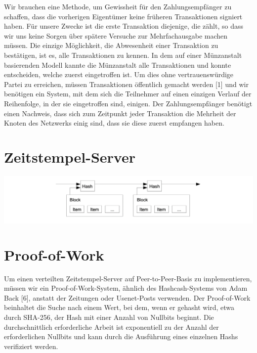\documentclass[10pt]{article}
\begin{document}
	Wir brauchen eine Methode, um Gewissheit für den Zahlungsempfänger zu schaffen, dass die vorherigen Eigentümer keine früheren Transaktionen signiert haben. Für unsere Zwecke ist die erste Transaktion diejenige, die zählt, so dass wir uns keine Sorgen über spätere Versuche zur Mehrfachausgabe machen müssen. Die einzige Möglichkeit, die Abwesenheit einer Transaktion zu bestätigen, ist es, alle Transaktionen zu kennen. In dem auf einer Münzanstalt basierenden Modell kannte die Münzanstalt alle Transaktionen und konnte entscheiden, welche zuerst eingetroffen ist. Um dies ohne vertrauenswürdige Partei zu erreichen, müssen Transaktionen öffentlich gemacht werden [1] und wir benötigen ein System, mit dem sich die Teilnehmer auf einen einzigen Verlauf der Reihenfolge, in der sie eingetroffen sind, einigen. Der Zahlungsempfänger benötigt einen Nachweis, dass sich zum Zeitpunkt jeder Transaktion die Mehrheit der Knoten des Netzwerks einig sind, dass sie diese zuerst empfangen haben.

	\section{Zeitstempel-Server}
	
	\begin{center}
		\includegraphics[scale=0.35]{pics/timestampserver.png}
	\end{center}

	\newpage
	
	\section{Proof-of-Work}
	
	Um einen verteilten Zeitstempel-Server auf Peer-to-Peer-Basis zu implementieren, müssen wir ein Proof-of-Work-System, ähnlich des Hashcash-Systems von Adam Back [6], anstatt der Zeitungen oder Usenet-Posts verwenden. Der Proof-of-Work beinhaltet die Suche nach einem Wert, bei dem, wenn er gehasht wird, etwa durch SHA-256, der Hash mit einer Anzahl von Nullbits beginnt. Die durchschnittlich erforderliche Arbeit ist exponentiell zu der Anzahl der erforderlichen Nullbits und kann durch die Ausführung eines einzelnen Hashs verifiziert werden.
\end{document}
